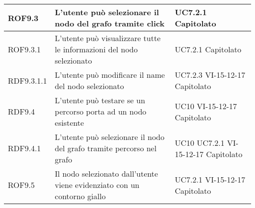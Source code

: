 \documentclass[../AnalisideiRequisiti.tex]{subfiles}
\begin{document}
\begin{longtable}{| p{3cm} | p{6cm} | p{3cm} |}
		\newline ROF9.3&
		\newline L'utente può selezionare il nodo del grafo tramite click&
		\newline UC7.2.1 \newline Capitolato
		\\[1em]
		\hline
		
			\newline ROF9.3.1&
		\newline L'utente può visualizzare tutte le informazioni del nodo selezionato&
		\newline UC7.2.1 \newline Capitolato
		\\[1em]
		\hline
			
		\newline RDF9.3.1.1&
		\newline L'utente può modificare il name del nodo selezionato&
		\newline UC7.2.3 \newline VI-15-12-17 \newline Capitolato
		\\[1em]
		\hline
		
		\newline RDF9.4&
		\newline L'utente può testare se un percorso porta ad un nodo esistente&
		\newline UC10 \newline VI-15-12-17 \newline Capitolato
		\\[1em]
		\hline
		
		\newline RDF9.4.1&
		\newline L'utente può selezionare il nodo del grafo tramite percorso nel grafo&
		\newline UC10 \newline UC7.2.1 \newline VI-15-12-17 \newline Capitolato
		\\[1em]
		\hline
		
		\newline ROF9.5&
		\newline Il nodo selezionato dall'utente viene evidenziato con un contorno giallo&
		\newline UC7.2.1 \newline VI-15-12-17 \newline Capitolato
		\\[1em]
		\hline
		

\end{longtable}
\end{document}
